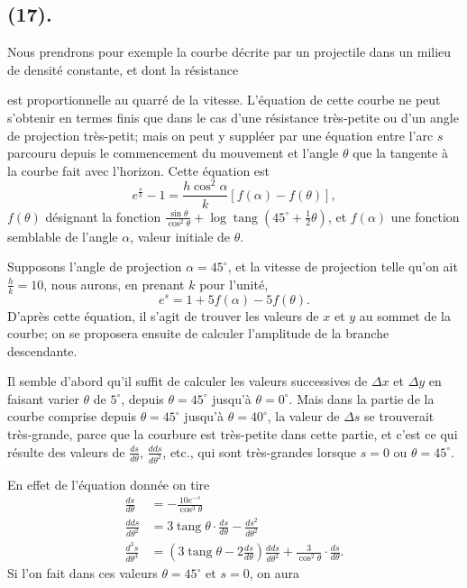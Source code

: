 \documentclass{article}
\begin{document}
\subsection*{(17).}

Nous prendrons pour exemple la courbe décrite par un projectile dans un milieu de densité constante, et dont la résistance

est proportionnelle au quarré de la vitesse. L'équation de cette courbe ne peut s'obtenir en termes finis que dans le cas d'une résistance très-petite ou d'un angle de projection très-petit; mais on peut y suppléer par une équation entre l'arc $s$ parcouru depuis le commencement du mouvement et l'angle $\theta$ que la tangente à la courbe fait avec l'horizon. Cette équation est
\[ e^{\frac{s}{k}}-1=\frac{h\cos^{2}\alpha}{k}[f(\alpha)-f(\theta)], \]
$f(\theta)$ désignant la fonction $\frac{\sin\theta}{\cos^{2}\theta}+\log\operatorname{tang}(45^{\circ}+\frac{1}{2}\theta)$, et $f(\alpha)$ une fonction semblable de l'angle $\alpha$, valeur initiale de $\theta$.

Supposons l'angle de projection $\alpha=45^{\circ}$, et la vitesse de projection telle qu'on ait $\frac{h}{k}=10$, nous aurons, en prenant $k$ pour l'unité,
\[ e^{s}=1+5f(\alpha)-5f(\theta). \]
D'après cette équation, il s'agit de trouver les valeurs de $x$ et $y$ au sommet de la courbe; on se proposera ensuite de calculer l'amplitude de la branche descendante.

Il semble d'abord qu'il suffit de calculer les valeurs successives de $\Delta x$ et $\Delta y$ en faisant varier $\theta$ de $5^{\circ}$, depuis $\theta=45^{\circ}$ jusqu'à $\theta=0^{\circ}$. Mais dans la partie de la courbe comprise depuis $\theta=45^{\circ}$ jusqu'à $\theta=40^{\circ}$, la valeur de $\Delta s$ se trouverait très-grande, parce que la courbure est très-petite dans cette partie, et c'est ce qui résulte des valeurs de $\frac{ds}{d\theta}$, $\frac{dds}{d\theta^{2}}$, etc., qui sont très-grandes lorsque $s=0$ ou $\theta=45^{\circ}$.

En effet de l'équation donnée on tire
\[ \begin{aligned} \frac{ds}{d\theta}&=-\frac{10e^{-s}}{\cos^{3}\theta}\\ \frac{dds}{d\theta^{2}}&=3\operatorname{tang}\theta\cdot\frac{ds}{d\theta}-\frac{ds^{2}}{d\theta^{2}}\\ \frac{d^{3}s}{d\theta^{3}}&=\left(3\operatorname{tang}\theta-2\frac{ds}{d\theta}\right)\frac{dds}{d\theta^{2}}+\frac{3}{\cos^{2}\theta}\cdot\frac{ds}{d\theta}. \end{aligned} \]
Si l'on fait dans ces valeurs $\theta=45^{\circ}$ et $s=0$, on aura
\end{document}

